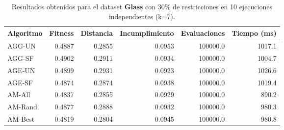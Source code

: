 \begin{table}[H]
    \centering
    \begin{tabular}{lrrrrr}
        \hline
        Algoritmo & Fitness & Distancia & Incumplimiento & Evaluaciones & Tiempo (ms)\\
        \hline
        AGG-UN & 0.4887 & 0.2855 & 0.0953 & 100000.0 & 1017.1 \\
        AGG-SF & 0.4902 & 0.2911 & 0.0934 & 100000.0 & 1004.7 \\
        AGE-UN & 0.4899 & 0.2931 & 0.0923 & 100000.0 & 1026.6 \\
        AGE-SF & 0.4874 & 0.2874 & 0.0938 & 100000.0 & 1019.4 \\
        AM-All & 0.4837 & 0.2855 & 0.0929 & 100000.0 & 890.2 \\
        AM-Rand & 0.4877 & 0.2888 & 0.0932 & 100000.0 & 980.3 \\
        AM-Best & 0.4819 & 0.2804 & 0.0945 & 100000.0 & 980.8 \\
        \hline
    \end{tabular}
    \caption{Resultados obtenidos para el dataset \textbf{Glass} con 30\% de restricciones en  10 ejecuciones independientes (k=7).}
    \label{tab:res_glass_30}
\end{table}